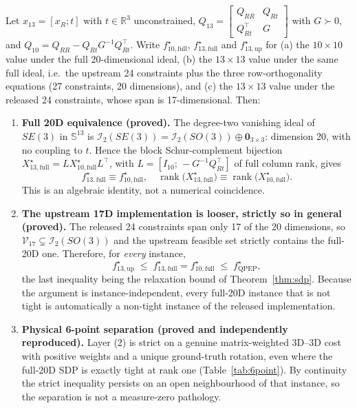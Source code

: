 \begin{theorem}\label{thm:thirteen}
Let $x_{13}=[x_R;t]$ with $t\in\mathbb{R}^3$ unconstrained,
$Q_{13}=\begin{bmatrix}Q_{RR}&Q_{Rt}\\Q_{Rt}^\top&G\end{bmatrix}$ with $G\succ0$, and $Q_{10}=Q_{RR}-Q_{Rt}G^{-1}Q_{Rt}^\top$. Write $f^\star_{10,\mathrm{full}}$, $f^\star_{13,\mathrm{full}}$ and $f^\star_{13,\mathrm{up}}$ for (a) the $10\times10$ value under the full 20-dimensional ideal, (b) the $13\times13$ value under the same full ideal, i.e.\ the upstream 24 constraints plus the three row-orthogonality equations (27 constraints, 20 dimensions), and (c) the $13\times13$ value under the released 24 constraints, whose span is 17-dimensional. Then:
\begin{enumerate}
\item \textbf{Full 20D equivalence (proved).} The degree-two vanishing ideal of $SE(3)$ in $\mathbb{S}^{13}$ is $\mathcal{I}_2(SE(3))=\mathcal{I}_2(SO(3))\oplus\mathbf{0}_{3\times3}$: dimension 20, with no coupling to $t$. Hence the block Schur-complement bijection $X^\star_{13,\mathrm{full}}=LX^\star_{10,\mathrm{full}}L^\top$, with $L=[I_{10};\,-G^{-1}Q_{Rt}^\top]$ of full column rank, gives
\begin{equation}
f^\star_{13,\mathrm{full}}\equiv f^\star_{10,\mathrm{full}},\quad\operatorname{rank}\big(X^\star_{13,\mathrm{full}}\big)\equiv\operatorname{rank}\big(X^\star_{10,\mathrm{full}}\big).
\label{eq:schur}
\end{equation}
This is an algebraic identity, not a numerical coincidence.
\item \textbf{The upstream 17D implementation is looser, strictly so in general (proved).} The released 24 constraints span only 17 of the 20 dimensions, so $\mathcal{V}_{17}\subsetneq\mathcal{I}_2(SO(3))$ and the upstream feasible set strictly contains the full-20D one. Therefore, for \emph{every} instance,
\begin{equation}
f^\star_{13,\mathrm{up}}\;\le\;f^\star_{13,\mathrm{full}}=f^\star_{10,\mathrm{full}}\;\le\;f^\star_{\mathrm{QPEP}},
\label{eq:hierarchy}
\end{equation}
the last inequality being the relaxation bound of Theorem~\ref{thm:sdp}. Because the argument is instance-independent, every full-20D instance that is not tight is automatically a non-tight instance of the released implementation.
\item \textbf{Physical 6-point separation (proved and independently reproduced).} Layer (2) is strict on a genuine matrix-weighted 3D--3D cost with positive weights and a unique ground-truth rotation, even where the full-20D SDP is exactly tight at rank one (Table~\ref{tab:6point}). By continuity the strict inequality persists on an open neighbourhood of that instance, so the separation is not a measure-zero pathology.
\end{enumerate}
\end{theorem}


